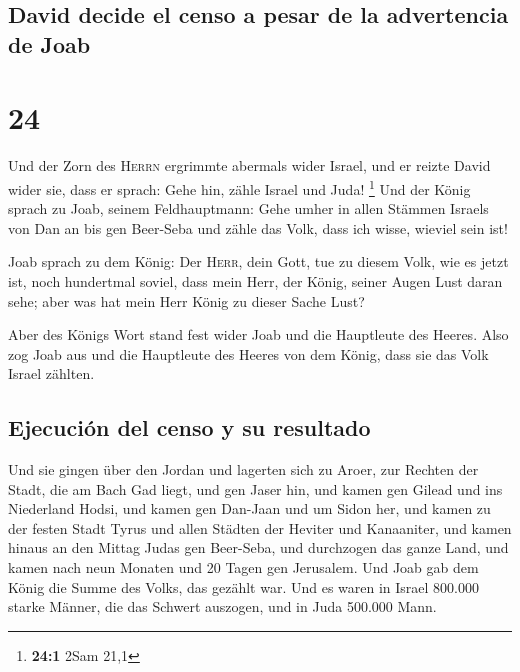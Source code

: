 \hypertarget{david-decide-el-censo-a-pesar-de-la-advertencia-de-joab}{%
\subsection{David decide el censo a pesar de la advertencia de
Joab}\label{david-decide-el-censo-a-pesar-de-la-advertencia-de-joab}}

\hypertarget{section-23}{%
\section{24}\label{section-23}}

 Und der Zorn des \textsc{Herrn} ergrimmte abermals wider
Israel, und er reizte David wider sie, dass er sprach: Gehe hin, zähle
Israel und Juda! \footnote{\textbf{24:1} 2Sam 21,1}  Und
der König sprach zu Joab, seinem Feldhauptmann: Gehe umher in allen
Stämmen Israels von Dan an bis gen Beer-Seba und zähle das Volk, dass
ich wisse, wieviel sein ist!

 Joab sprach zu dem König: Der \textsc{Herr}, dein Gott,
tue zu diesem Volk, wie es jetzt ist, noch hundertmal soviel, dass mein
Herr, der König, seiner Augen Lust daran sehe; aber was hat mein Herr
König zu dieser Sache Lust?

 Aber des Königs Wort stand fest wider Joab und die
Hauptleute des Heeres. Also zog Joab aus und die Hauptleute des Heeres
von dem König, dass sie das Volk Israel zählten.

\hypertarget{ejecuciuxf3n-del-censo-y-su-resultado}{%
\subsection{Ejecución del censo y su
resultado}\label{ejecuciuxf3n-del-censo-y-su-resultado}}

 Und sie gingen über den Jordan und lagerten sich zu
Aroer, zur Rechten der Stadt, die am Bach Gad liegt, und gen Jaser hin,
 und kamen gen Gilead und ins Niederland Hodsi, und kamen
gen Dan-Jaan und um Sidon her,  und kamen zu der festen
Stadt Tyrus und allen Städten der Heviter und Kanaaniter, und kamen
hinaus an den Mittag Judas gen Beer-Seba,  und durchzogen
das ganze Land, und kamen nach neun Monaten und 20 Tagen gen Jerusalem.
 Und Joab gab dem König die Summe des Volks, das gezählt
war. Und es waren in Israel 800.000 starke Männer, die das Schwert
auszogen, und in Juda 500.000 Mann.

